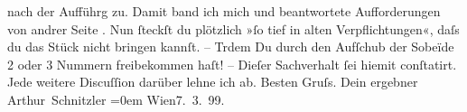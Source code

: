 \begin{ledgroupsized}[t]{13cm}
               nach der Aufführg zu. Damit band ich mich und beantwortete Aufforderungen von andrer
               Seite \label{K_L00899_2v}\label{K_L00899_2h}. Nun
               ſteckſt du plötzlich »ſo tief in alten Verpflichtungen«, daſs du das Stück {\pb}nicht bringen kannſt. –
                  Trdem Du durch den Aufſchub der Sobeïde 2
               oder 3 Nummern freibekommen haſt! – \pend
           \pstart
           Dieſer Sachverhalt ſei hiemit conſtatirt. Jede weitere Discuſſion darüber lehne ich
               ab.\pend
           \pstart
           Besten Gruſs. Dein ergebner{\\[\baselineskip]}\spacefill\mbox{Arthur Schnitzler}\pend
           \leftskip=0em{}\pstart
           Wien7. 3. 99.\pend
           
         
         \endnumbering{}\end{ledgroupsized}  \newcommand{\dateiname}{L00899}\newcommand{\titel}{Arthur Schnitzler an Hermann Bahr, 7. 3. 1899}\newcommand{\editorInnen}{ Kurt Ifkovits,  Martin Anton Müller}
      